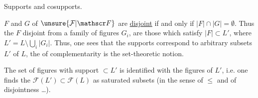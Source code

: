 Supports and cosupports.

$F$ and $G$ of $\unsure{\mathcal F|\mathscr F}$ are \uline{disjoint}  if and only if $\lvert F\rvert\cap\lvert G\rvert=\emptyset$. Thus the $F$ disjoint from a family of figures $G_i$, are those which  satisfy $\lvert F\rvert\subset L'$, where $L'=L\setminus\bigcup_i\lvert G_i\rvert$. Thus, one sees that the supports correspond to arbitrary subsets $L'$ of $L$, the  of complementarity is the set-theoretic notion.

 The set of figures  with support $\subset L'$  is identified with the figures of $L'$, i.e. one finds the $\mathcal F(L')\subset\mathcal F(L)$ as saturated subsets (in the sense of $\leq$ and of disjointness \ldots).
